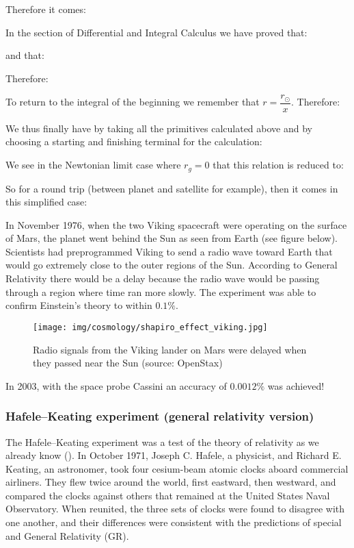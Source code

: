 	Therefore it comes:
	
	In the section of Differential and Integral Calculus we have proved that:
	
	and that:
	
	Therefore:
	
	To return to the integral of the beginning we remember that $r=\dfrac{r_\odot}{x}$. Therefore:
	
	We thus finally have by taking all the primitives calculated above and by choosing a starting and finishing terminal for the calculation:
	
	We see in the Newtonian limit case where $r_g=0$ that this relation is reduced to:
	
	So for a round trip (between planet and satellite for example), then it comes in this simplified case:
	
	In November 1976, when the two Viking spacecraft were operating on the surface of Mars, the planet went
behind the Sun as seen from Earth (see figure below). Scientists had preprogrammed Viking to send a radio wave toward Earth that would go extremely close to the outer regions of the Sun. According to General Relativity there would be a delay because the radio wave would be passing through a region where time ran more slowly. The experiment was able to confirm Einstein’s theory to within $0.1\%$.
	\begin{figure}[H]
		\centering
		\texttt{[image: img/cosmology/shapiro\_effect\_viking.jpg]}	
		\caption[Delayed Radio signals from the Viking lander on Mars]{Radio signals from the Viking lander on Mars were delayed when they passed near the Sun (source: OpenStax)}
	\end{figure}
	In 2003, with the space probe Cassini an accuracy of $0.0012\%$ was achieved!
	
	\subsubsection{Hafele–Keating experiment (general relativity version)}
	The Hafele–Keating experiment was a test of the theory of relativity as we already know (). In October 1971, Joseph C. Hafele, a physicist, and Richard E. Keating, an astronomer, took four cesium-beam atomic clocks aboard commercial airliners. They flew twice around the world, first eastward, then westward, and compared the clocks against others that remained at the United States Naval Observatory. When reunited, the three sets of clocks were found to disagree with one another, and their differences were consistent with the predictions of special and General Relativity (GR).
	
